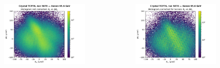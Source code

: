 \documentclass[10pt]{beamer}
\begin{document}
\begin{frame}
\begin{columns}[c]
\begin{figure}
\includegraphics[width=0.9\linewidth]{nocorr_histo.pdf}\\
\end{figure}%
\vspace{-0.5cm}%
\begin{figure}
\includegraphics[width=0.9\linewidth]{corrected_histo.pdf}\\
\end{figure}


\end{columns}
\end{frame}
\end{document}
